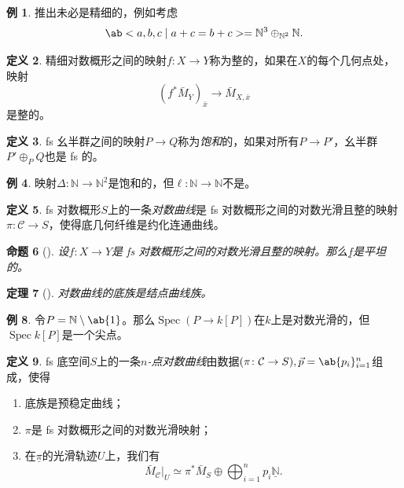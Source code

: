 \documentclass{amsart}
\newtheorem{thm}{定理}[section]
\newtheorem{prop}[thm]{命题}
\theoremstyle{definition}
\newtheorem{defn}[thm]{定义}
\newtheorem{exm}[thm]{例}
\theoremstyle{remark}
\theoremstyle{plain}
\theoremstyle{definition}
\theoremstyle{remark}
\newcommand{\N}{\mathbb{N}}
\newcommand{\mc}[1]{\mathcal{#1}}
\newcommand{\ul}[1]{\underline{#1}}
\newcommand{\1}{\mathbf{1}}
\newcommand{\2}{\mathbf{2}}
\newcommand{\3}{\mathbf{3}}
\DeclareMathOperator{\Spec}{Spec}
\begin{document}
\begin{exm}
    推出未必是精细的，例如考虑
    \[ \ab< a ,b,c \mid a+c=b+c> = \N^3 \oplus_{\N^2} \N. \]
\end{exm}

\begin{defn}
    精细对数概形之间的映射\(f \colon X \to Y\)称为整的，如果在\(X\)的每个几何点处，映射
    \[ (f^*\bar{M}_Y)_{\bar{x}} \to \bar{M}_{X,\bar{x}} \]
    是整的。
\end{defn}

\begin{defn}
    fs 幺半群之间的映射\(P \to Q\)称为\textit{饱和}的，如果对所有\(P \to P'\)，幺半群\(P' \oplus_P Q\)也是 fs 的。
\end{defn}

\begin{exm}
    映射\(\Delta \colon \N \to \N^2\)是饱和的，但\(\ell \colon \N \to \N\)不是。
\end{exm}

\begin{defn}
    fs 对数概形\(S\)上的一条\textit{对数曲线}是 fs 对数概形之间的对数光滑且整的映射\(\pi \colon \mc{C} \to S\)，使得底几何纤维是约化连通曲线。
\end{defn}

\begin{prop}[{\cite{Kato1989}}]
    设\(f \colon X \to Y\)是 fs 对数概形之间的对数光滑且整的映射。那么\(\ul{f}\)是平坦的。
\end{prop}

\begin{thm}[{\cite{FKato2000}}]
    对数曲线的底族是结点曲线族。
\end{thm}

\begin{exm}
    令\(P = \N \setminus \ab\{1\}\)。那么\(\Spec (P \to k[P])\)在\(k\)上是对数光滑的，但\(\Spec k[P]\)是一个尖点。
\end{exm}

\begin{defn}
    fs 底空间\(S\)上的一条\textit{\(n\)-点对数曲线}由数据\((\pi \colon \mc{C} \to S), \vec{p} = \ab\{p_i\}_{i=1}^n\)组成，使得
    \begin{enumerate}
        \item 底族是预稳定曲线；
        \item \(\pi\)是 fs 对数概形之间的对数光滑映射；
        \item 在\(\ul{\pi}\)的光滑轨迹\(U\)上，我们有
            \[ \bar{M}_{\mc{C}}|_U \simeq \pi^* \bar{M}_S \oplus \bigoplus_{i=1}^n p_i \ul{\N}. \]
    \end{enumerate}
\end{defn}
\end{document}
